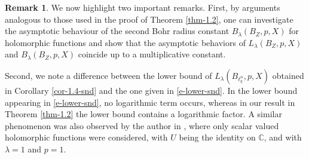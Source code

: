 \documentclass[a4paper,11pt, reqno]{amsart}
\theoremstyle{definition}
\newtheorem{rem}{Remark}[section]
\begin{document}
\begin{rem}
We now highlight two important remarks. First, by arguments analogous to those used in the proof of Theorem \ref{thm-1.2}, one can investigate the asymptotic behaviour of the second Bohr radius constant $B_{\lambda}(B_{Z}, p,X)$ for holomorphic functions and show that the asymptotic behaviors of $L_{\lambda}(B_{Z}, p,X)$ and $B_{\lambda}(B_{Z}, p,X)$ coincide up to a multiplicative constant. 
\par
Second, we note a difference between the lower bound of $L_{\lambda}(B_{\ell^n_q}, p,X)$ obtained in Corollary \ref{cor-1.4-snd} and the one given in \eqref{e-lower-snd}. In the lower bound appearing in \eqref{e-lower-snd}, no logarithmic term occurs, whereas in our result in Theorem \ref{thm-1.2} the lower bound contains a logarithmic factor. A similar phenomenon was also observed by the author in \cite{das-2024-CMB}, where only scalar valued holomorphic functions were considered, with $U$ being the identity on $\mathbb{C}$, and with $\lambda=1$ and $p=1$.
\end{rem}
\end{document}
